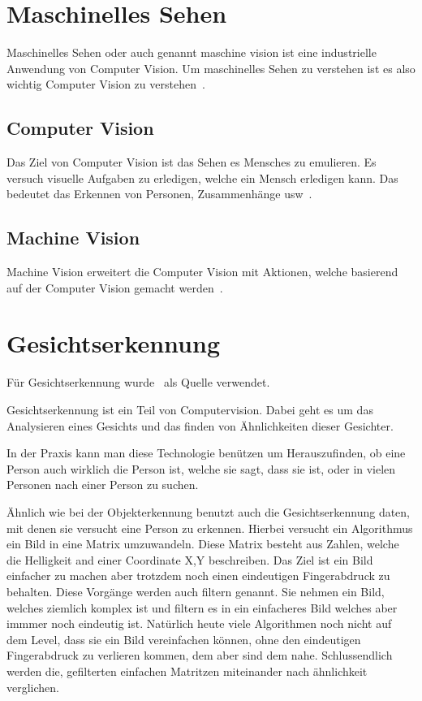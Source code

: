 \section{Maschinelles Sehen}
\label{sec:maschinelles-sehen}

Maschinelles Sehen oder auch genannt maschine vision ist eine industrielle Anwendung von Computer Vision.
Um maschinelles Sehen zu verstehen ist es also wichtig Computer Vision zu verstehen~\cite{Anonym_2014}.

\subsection{Computer Vision}
\label{subsec:computer-vision}

Das Ziel von Computer Vision ist das Sehen es Mensches zu emulieren.
Es versuch visuelle Aufgaben zu erledigen, welche ein Mensch erledigen kann.
Das bedeutet das Erkennen von Personen, Zusammenhänge usw~\cite{Huang1996ComputerVE}.

\subsection{Machine Vision}\label{subsec:machine-vision}

Machine Vision erweitert die Computer Vision mit Aktionen, welche basierend auf der Computer Vision gemacht werden~\cite{Anonym_2014}.

\section{Gesichtserkennung}
\label{sec:gesichtserkennung}

Für Gesichtserkennung wurde~\cite{Lewis_2021} als Quelle verwendet.

Gesichtserkennung ist ein Teil von Computervision.
Dabei geht es um das Analysieren eines Gesichts und das finden von Ähnlichkeiten dieser Gesichter.

In der Praxis kann man diese Technologie benützen um Herauszufinden, ob eine Person auch wirklich die Person ist, welche sie sagt, dass sie ist, oder in vielen Personen nach einer Person zu suchen.

Ähnlich wie bei der Objekterkennung benutzt auch die Gesichtserkennung daten, mit denen sie versucht eine Person zu erkennen.
Hierbei versucht ein Algorithmus ein Bild in eine Matrix umzuwandeln.
Diese Matrix besteht aus Zahlen, welche die Helligkeit and einer Coordinate X,Y beschreiben.
Das Ziel ist ein Bild einfacher zu machen aber trotzdem noch einen eindeutigen Fingerabdruck zu behalten.
Diese Vorgänge werden auch filtern genannt.
Sie nehmen ein Bild, welches ziemlich komplex ist und filtern es in ein einfacheres Bild welches aber immmer noch eindeutig ist.
Natürlich heute viele Algorithmen noch nicht auf dem Level, dass sie ein Bild vereinfachen können, ohne den eindeutigen Fingerabdruck zu verlieren kommen, dem aber sind dem nahe.
Schlussendlich werden die, gefilterten einfachen Matritzen miteinander nach ähnlichkeit verglichen.


